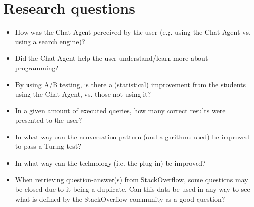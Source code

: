 \section{Research questions}
\label{chapter2:research_questions}
\begin{itemize}
	\item How was the Chat Agent perceived by the user (e.g. using the Chat Agent vs. using a search engine)?
	\item Did the Chat Agent help the user understand/learn more about programming?
	\item By using A/B testing, is there a (statistical) improvement from the students using the Chat Agent, vs. those not using it?
	\item In a given amount of executed queries, how many correct results were presented to the user? 
	\item In what way can the conversation pattern (and algorithms used) be improved to pass a Turing test?
	\item In what way can the technology (i.e. the plug-in) be improved? 
	\item When retrieving question-answer(s) from StackOverflow, some questions may be closed due to it being a duplicate. 
	Can this data be used in any way to see what is defined by the StackOverflow community as a good question?
\end{itemize}

